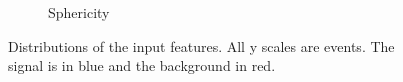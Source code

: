 \begin{figure}[htbp]
\begin{subfigure}[b]{0.3\textwidth}
	                \caption{Sphericity}
	                \label{fig:sphericity}
	\end{subfigure}

	\caption{Distributions of the input features. All y scales are events. The signal is in blue and the background in red.}
	
	\label{fig:label}
\end{figure} 

